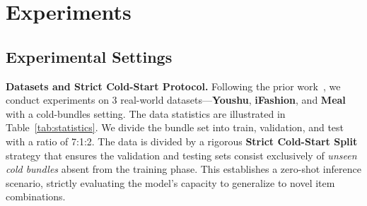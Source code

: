 \documentclass[lettersize,journal]{IEEEtran}
\begin{document}




\section{Experiments}

\subsection{Experimental Settings}

\noindent\textbf{Datasets and Strict Cold-Start Protocol.}
Following the prior work~\cite{bui2025personalized}, we conduct experiments on 3 real-world datasets—\textbf{Youshu}, \textbf{iFashion}, and \textbf{Meal} with a cold-bundles setting. The data statistics are illustrated in Table~\ref{tab:statistics}.
We divide the bundle set into train, validation, and test with a ratio of 7:1:2. The data is divided by a rigorous \textbf{Strict Cold-Start Split} strategy that ensures the validation and testing sets consist exclusively of \textit{unseen cold bundles} absent from the training phase. This establishes a zero-shot inference scenario, strictly evaluating the model's capacity to generalize to novel item combinations. 
\end{document}
